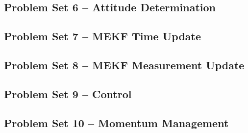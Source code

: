 \newpage
\subsection{Problem Set 6 – Attitude Determination}






\newpage
\subsection{Problem Set 7 – MEKF Time Update}


\newpage
\subsection{Problem Set 8 – MEKF Measurement Update}




\newpage
\subsection{Problem Set 9 – Control}





\newpage
\subsection{Problem Set 10 – Momentum Management}


